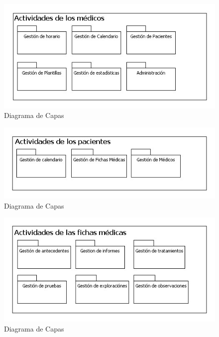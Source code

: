 		\begin{figure}[H]
		  \centering
		    \includegraphics[width=12cm]{img/jpg/dcapas/Actividades_medicos.jpg}
		  \caption{Diagrama de Capas}
		  \label{fig:dcapas_medicos}
		\end{figure}

		\begin{figure}[H]
		  \centering
		    \includegraphics[width=12cm]{img/jpg/dcapas/Actividades_Pacientes.jpg}
		  \caption{Diagrama de Capas}
		  \label{fig:dcapas_pacientes}
		\end{figure}

		\begin{figure}[H]
		  \centering
		    \includegraphics[width=12cm]{img/jpg/dcapas/fichas_medicas.jpg}
		  \caption{Diagrama de Capas}
		  \label{fig:dcapas_fichas}
		\end{figure}





